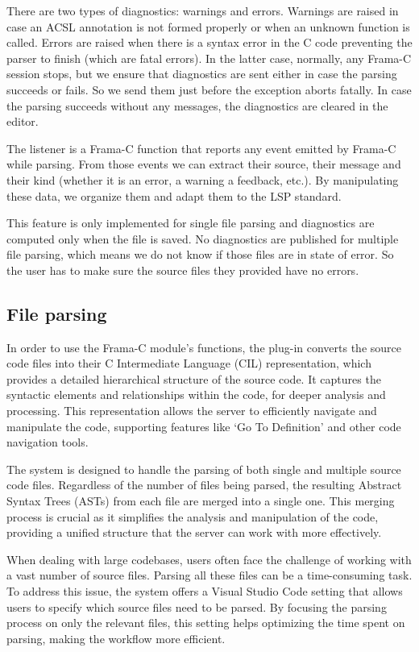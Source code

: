 \documentclass[10pt]{article}
\begin{document}
\begin{singlespace}
There are two types of diagnostics: warnings and errors. Warnings are raised in case an ACSL annotation is not formed properly or when an unknown function is called. Errors are raised when there is a syntax error in the C code preventing the parser to finish (which are fatal errors). In the latter case, normally, any Frama-C session stops, but we ensure that diagnostics are sent either in case the parsing succeeds or fails. So we send them just before the exception aborts fatally.
In case the parsing succeeds without any messages, the diagnostics are cleared in the editor.

The listener is a Frama-C function that reports any event emitted by Frama-C while parsing. From those events we can extract their source, their message and their kind (whether it is an error, a warning a feedback, etc.). By manipulating these data, we organize them and adapt them to the LSP standard.

This feature is only implemented for single file parsing and diagnostics are computed only when the file is saved. No diagnostics are published for multiple file parsing, which means we do not know if those files are in state of error. So the user has to make sure the source files they provided have no errors.

\subsection{File parsing}
In order to use the Frama-C module's functions, the plug-in converts the source code files into their C Intermediate Language (CIL) representation, which provides a detailed hierarchical structure of the source code. It captures the syntactic elements and relationships within the code, for deeper analysis and processing. This representation allows the server to efficiently navigate and manipulate the code, supporting features like `Go To Definition' and other code navigation tools.

The system is designed to handle the parsing of both single and multiple source code files. Regardless of the number of files being parsed, the resulting Abstract Syntax Trees (ASTs) from each file are merged into a single one. This merging process is crucial as it simplifies the analysis and manipulation of the code, providing a unified structure that the server can work with more effectively.

When dealing with large codebases, users often face the challenge of working with a vast number of source files. Parsing all these files can be a time-consuming task. To address this issue, the system offers a Visual Studio Code setting that allows users to specify which source files need to be parsed. By focusing the parsing process on only the relevant files, this setting helps optimizing the time spent on parsing, making the workflow more efficient.


\end{singlespace}
\end{document}
